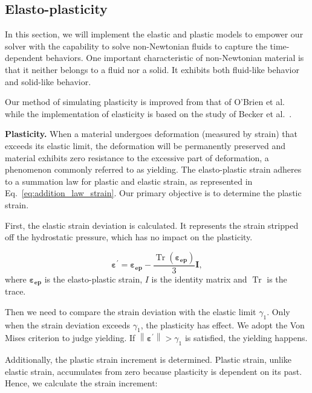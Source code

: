 \documentclass[10pt,journal,compsoc]{IEEEtran}
\begin{document}
\subsection{Elasto-plasticity}\label{sec:Elasticity-Plasticity}

In this section, we will implement the elastic and plastic models to empower our solver with the capability to solve non-Newtonian fluids to capture the time-dependent behaviors. One important characteristic of non-Newtonian material is that it neither belongs to a fluid nor a solid. It exhibits both fluid-like behavior and solid-like behavior.

Our method of simulating plasticity is improved from that of O'Brien et al.~\cite{OBrien2002} while the implementation of elasticity is based on the study of Becker et al.~\cite{Becker2009}.



\textbf{Plasticity.}\label{sec:plasticity}
When a material undergoes deformation (measured by strain) that exceeds its elastic limit, the deformation will be permanently preserved and material exhibits zero resistance to the excessive part of deformation, a phenomenon commonly referred to as yielding. The elasto-plastic strain adheres to a summation law for plastic and elastic strain, as represented in Eq.~\ref{eq:addition_law_strain}. Our primary objective is to determine the plastic strain.


First, the elastic strain deviation is calculated. It represents the strain stripped off the hydrostatic pressure, which has no impact on the plasticity.

\begin{equation}
	\mathbf{\varepsilon}^{\prime}=\mathbf{{ \varepsilon_{ep}}}-\frac{\operatorname{Tr}\left(\mathbf{{ \varepsilon_{ep}}}\right)}{3} \mathbf{I},\label{eq:elastic strain}
\end{equation}
where $\mathbf{{ \varepsilon_{ep}}}$ is the elasto-plastic strain, $I$ is the identity matrix and $\operatorname{Tr}$ is the trace.

Then we need to compare the strain deviation with the elastic limit $\gamma_1$. Only when the strain deviation exceeds $\gamma_1$, the plasticity has effect. We adopt the Von Mises criterion to judge yielding. If $\left\|\mathbf{\varepsilon}^{\prime}\right\|>\gamma_1 $ is satisfied, the yielding happens.

Additionally, the plastic strain increment is determined. Plastic strain, unlike elastic strain, accumulates from zero because plasticity is dependent on its past. Hence, we calculate the strain increment:
\end{document}
